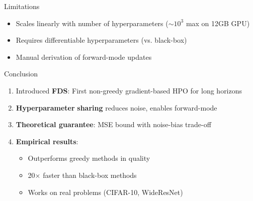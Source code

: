 \documentclass{beamer}
\begin{document}
\begin{frame}{Limitations}
\begin{itemize}
    \item Scales linearly with number of hyperparameters (\(\sim 10^3\) max on 12GB GPU)
    \item Requires differentiable hyperparameters (vs. black-box)
    \item Manual derivation of forward-mode updates
\end{itemize}
\end{frame}

\begin{frame}{Conclusion}
\begin{enumerate}
    \item Introduced \textbf{FDS}: First non-greedy gradient-based HPO for long horizons
    \item \textbf{Hyperparameter} \textbf{sharing} reduces noise, enables forward-mode
    \item \textbf{Theoretical guarantee}: MSE bound with noise-bias trade-off
    \item \textbf{Empirical results}: 
    \begin{itemize}
        \item Outperforms greedy methods in quality
        \item 20× faster than black-box methods
        \item Works on real problems (CIFAR-10, WideResNet)
    \end{itemize}
\end{enumerate}
\end{frame}
\end{document}
